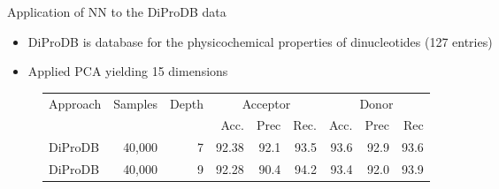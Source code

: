 \documentclass[10pt]{beamer}
\begin{document}
\begin{frame}{Application of NN to the DiProDB data}
	\begin{itemize}
		\item DiProDB is database for the physicochemical properties of dinucleotides (127 entries)
		\item Applied PCA yielding 15 dimensions
	\end{itemize}
	\pause
		\begin{figure}
		\small
		\centering
		\begingroup
		\def\arraystretch{1.2}
		\begin{tabular}{|l|r|r|r|r|r|r|r|r|}
			\hline
			Approach & Samples & Depth & \multicolumn{3}{|c|}{Acceptor} & \multicolumn{3}{c|}{Donor} \\
			\cline{4-9}
			&&& Acc. & Prec & Rec. & Acc. & Prec & Rec \\
			\hline
			DiProDB & 40,000 & 7 & 92.38 & 92.1 & 93.5 & 93.6 & 92.9 & 93.6 \\
			DiProDB & 40,000 & 9 & 92.28 & 90.4 & 94.2 & 93.4 & 92.0 & 93.9 \\
			
			\hline  
		\end{tabular}
		\endgroup
	\end{figure}
\end{frame}
\end{document}
